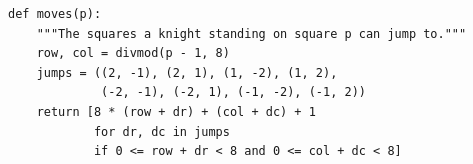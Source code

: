 \begin{verbatim}
def moves(p):
    """The squares a knight standing on square p can jump to."""
    row, col = divmod(p - 1, 8)
    jumps = ((2, -1), (2, 1), (1, -2), (1, 2),
             (-2, -1), (-2, 1), (-1, -2), (-1, 2))
    return [8 * (row + dr) + (col + dc) + 1
            for dr, dc in jumps
            if 0 <= row + dr < 8 and 0 <= col + dc < 8]
\end{verbatim}
